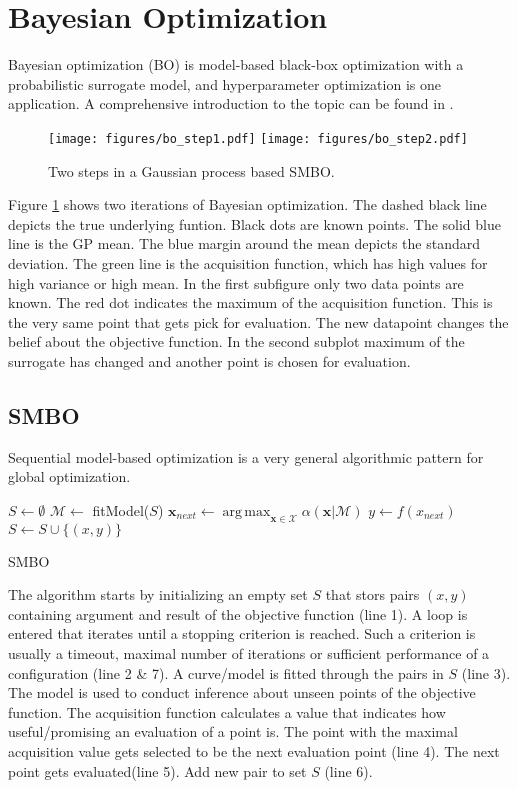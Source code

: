 \documentclass[english]{article}
\newcommand{\x}{\mathbf{x}}
\newcommand{\M}{\mathcal{M}}
\newcommand{\X}{\mathcal{X}}
\DeclareMathOperator*{\argmax}{arg\,max}
\begin{document}
\newpage


\section{Bayesian Optimization}
Bayesian optimization (BO) is model-based black-box optimization with a probabilistic surrogate model, and hyperparameter optimization is one application. A comprehensive introduction to the topic can be found in \cite{shahriari_taking_2016}.

\begin{figure}
  \texttt{[image: figures/bo\_step1.pdf]}
  \texttt{[image: figures/bo\_step2.pdf]}
  \caption{Two steps in a Gaussian process based SMBO.}
  \label{bayesian optimization}
\end{figure}

Figure \ref{bayesian optimization} shows two iterations of Bayesian optimization. The dashed black line depicts the true underlying funtion. Black dots are known points. The solid blue line is the GP mean. The blue margin around the mean depicts the standard deviation. The green line is the acquisition function, which has high values for high variance or high mean. In the first subfigure only two data points are known. The red dot indicates the maximum of the acquisition function. This is the very same point that gets pick for evaluation. The new datapoint changes the belief about the objective function. In the second subplot maximum of the surrogate has changed and another point is chosen for evaluation.

\subsection{SMBO}
Sequential model-based optimization is a very general algorithmic pattern for global optimization.

\begin{algorithm}[H]
\SetAlgoLined

$S \leftarrow \emptyset$\;
{
  $\mathcal{M} \leftarrow$ fitModel($S$)\;
  $\x_{next} \leftarrow \argmax_{\x \in \X} \alpha(\x|\M)$\;
  $y \leftarrow f(x_{next})$\;
  $S \leftarrow S \cup \{(x,y)\}$\;
}
\caption{SMBO}
\end{algorithm}

The algorithm starts by initializing an empty set $S$ that stors pairs $(x,y)$ containing argument and result of the objective function (line 1). A loop is entered that iterates until a stopping criterion is reached. Such a criterion is usually a timeout, maximal number of iterations or sufficient performance of a configuration (line 2 \& 7). A curve/model is fitted through the pairs in $S$ (line 3). The model is used to conduct inference about unseen points of the objective function. The acquisition function calculates a value that indicates how useful/promising an evaluation of a point is. The point with the maximal acquisition value gets selected to be the next evaluation point (line 4). The next point gets evaluated(line 5). Add new pair to set $S$ (line 6).
\end{document}
